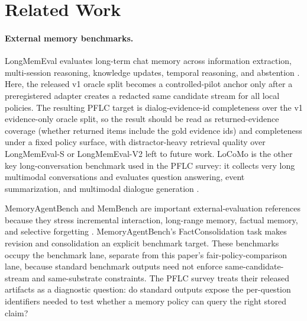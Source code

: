 \section{Related Work}

\paragraph{External memory benchmarks.}
LongMemEval evaluates long-term chat memory across information extraction,
multi-session reasoning, knowledge updates, temporal reasoning, and
abstention \cite{longmemeval2024}. Here, the released v1 oracle split becomes
a controlled-pilot anchor only after a preregistered adapter creates a redacted
same candidate stream for all local policies. The resulting PFLC target is
dialog-evidence-id completeness over the v1 evidence-only oracle split, so the
result should be read as returned-evidence coverage (whether returned items
include the gold evidence ids) and completeness under a fixed policy surface, with
distractor-heavy retrieval quality over LongMemEval-S or LongMemEval-V2 left to
future work.
LoCoMo is the other key long-conversation benchmark used in the PFLC survey:
it collects very long multimodal conversations and evaluates question
answering, event summarization, and multimodal dialogue generation
\cite{locomo2024}.

MemoryAgentBench and MemBench are important external-evaluation references
because they stress incremental interaction, long-range memory, factual memory,
and selective forgetting \cite{memoryagentbench2025,membench2025}.
MemoryAgentBench's FactConsolidation task makes revision and consolidation an
explicit benchmark target. These benchmarks occupy the benchmark lane, separate
from this paper's fair-policy-comparison lane, because standard benchmark
outputs need not enforce same-candidate-stream and same-substrate constraints.
The PFLC survey treats their released artifacts as a diagnostic question: do
standard outputs expose the per-question identifiers needed to test whether a
memory policy can query the right stored claim?

